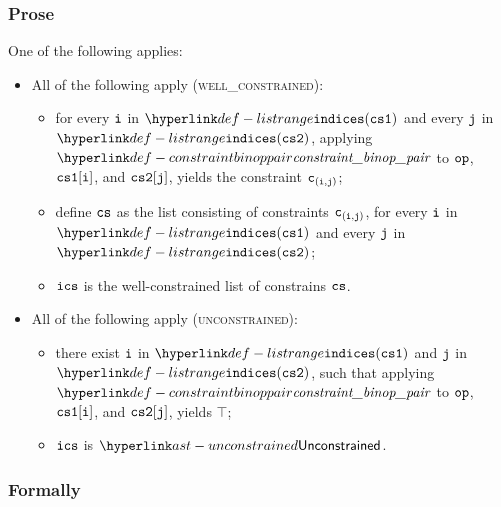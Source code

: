 \subsubsection{Prose}
One of the following applies:
\begin{itemize}
  \item All of the following apply (\textsc{well\_constrained}):
  \begin{itemize}
    \item for every $\vi$ in $\listrange(\csone)$ and every $\vj$ in $\listrange(\cstwo)$,
          applying \\
          $\constraintbinoppair$ to $\op$, $\csone[\vi]$, and $\cstwo[\vj]$,
          yields the constraint $\vc_{(\vi,\vj)}$;
    \item define $\cs$ as the list consisting of constraints $\vc_{(\vi,\vj)}$,
          for every $\vi$ in $\listrange(\csone)$ and every $\vj$ in $\listrange(\cstwo)$;
    \item $\vics$ is the well-constrained list of constrains $\cs$.
  \end{itemize}

  \item All of the following apply (\textsc{unconstrained}):
  \begin{itemize}
    \item there exist $\vi$ in $\listrange(\csone)$ and $\vj$ in $\listrange(\cstwo)$,
          such that applying
          $\constraintbinoppair$ to $\op$, $\csone[\vi]$, and $\cstwo[\vj]$,
          yields $\top$;
    \item $\vics$ is $\unconstrained$.
  \end{itemize}
\end{itemize}

\subsubsection{Formally}
\begin{mathpar}
\end{mathpar}

